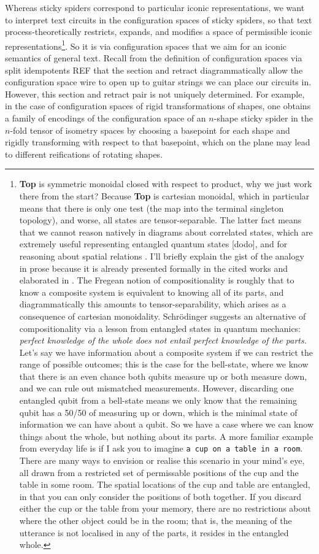Whereas sticky spiders correspond to particular iconic representations, we want to interpret text circuits in the configuration spaces of sticky spiders, so that text process-theoretically restricts, expands, and modifies a space of permissible iconic representations\footnote{\textbf{Top} is symmetric monoidal closed with respect to product, why we just work there from the start? Because \textbf{Top} is cartesian monoidal, which in particular means that there is only one test (the map into the terminal singleton topology), and worse, all states are tensor-separable. The latter fact means that we cannot reason natively in diagrams about correlated states, which are extremely useful representing entangled quantum states [dodo], and for reasoning about spatial relations \bR [talkspace] \e. I'll briefly explain the gist of the analogy in prose because it is already presented formally in the cited works and elaborated in \bR [bobcomp] \e. The Fregean notion of compositionality is roughly that to know a composite system is equivalent to knowing all of its parts, and diagrammatically this amounts to tensor-separability, which arises as a consequence of cartesian monoidality. Schr\"{o}dinger suggests an alternative of compositionality via a lesson from entangled states in quantum mechanics: \emph{perfect knowledge of the whole does not entail perfect knowledge of the parts.} Let's say we have information about a composite system if we can restrict the range of possible outcomes; this is the case for the bell-state, where we know that there is an even chance both qubits measure up or both measure down, and we can rule out mismatched measurements. However, discarding one entangled qubit from a bell-state means we only know that the remaining qubit has a 50/50 of measuring up or down, which is the minimal state of information we can have about a qubit. So we have a case where we can know things about the whole, but nothing about its parts. A more familiar example from everyday life is if I ask you to imagine \texttt{a cup on a table in a room}. There are many ways to envision or realise this scenario in your mind's eye, all drawn from a restricted set of permissable positions of the cup and the table in some room. The spatial locations of the cup and table are entangled, in that you can only consider the positions of both together. If you discard either the cup or the table from your memory, there are no restrictions about where the other object could be in the room; that is, the meaning of the utterance is not localised in any of the parts, it resides in the entangled whole.}. So it is via configuration spaces that we aim for an iconic semantics of general text. Recall from the definition of configuration spaces via split idempotents \bR REF \e that the section and retract diagrammatically allow the configuration space wire to open up to guitar strings we can place our circuits in. However, this section and retract pair is not uniquely determined. For example, in the case of configuration spaces of rigid transformations of shapes, one obtains a family of encodings of the configuration space of an $n$-shape sticky spider in the $n$-fold tensor of isometry spaces by choosing a basepoint for each shape and rigidly transforming with respect to that basepoint, which on the plane may lead to different reifications of rotating shapes.
